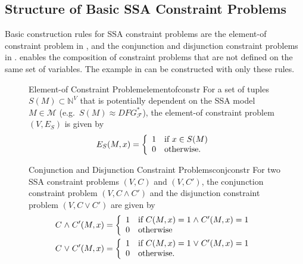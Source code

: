 \subsection{Structure of Basic SSA Constraint Problems}

    Basic construction rules for SSA constraint problems are the element-of
    constraint problem in ,
    and the conjunction and disjunction constraint problems in
    .
     enables the composition of constraint problems that are
    not defined on the same set of variables.
    The example in  can be constructed with only
    these rules.

\begin{figure}[p]
    \begin{definition}{Element-of Constraint Problem}{elementofconstr}
        For a set of tuples $S(M)\subset\mathbb N^V$ that is potentially
        dependent on the SSA model $M\in\mathcal M$
        (e.g.\ $S(M)\approx DFG_\mathcal F^*$),
        the element-of constraint problem $(V,E_S)$ is given by
        \begin{align*}
            E_S(M,x)=\left\{\begin{array}{l}
                                1\text{\quad if }x \in S(M)\\
                                0\text{\quad otherwise}.
                            \end{array}\right.
        \end{align*}
    \end{definition}

    \begin{definition}{Conjunction and Disjunction Constraint Problems}{conjconstr}
        For two SSA constraint problems $(V,C)$ and $(V,C')$, the
        conjunction constraint problem $(V,C\mathrel\land C')$ and the
        disjunction constraint problem $(V,C\mathrel\lor C')$ are given by
        \begin{align*}
            &C\mathrel\land C'(M,x)=\left\{
                \begin{array}{l}
                    1\text{\quad if }C(M,x)=1\mathrel\land C'(M,x)=1\\
                    0\text{\quad otherwise}
                \end{array}\right.\\
            &C\mathrel\lor C'(M,x)=\left\{
                \begin{array}{l}
                    1\text{\quad if }C(M,x)=1\mathrel\lor C'(M,x)=1\\
                    0\text{\quad otherwise}.
                \end{array}\right.
        \end{align*}
    \end{definition}


\end{figure}
